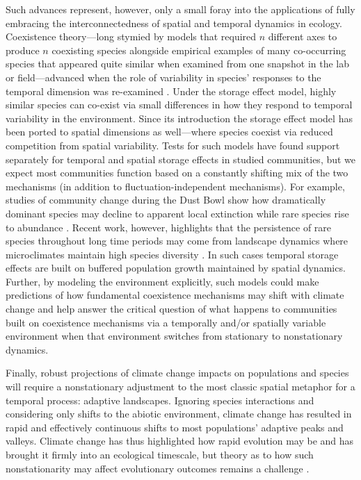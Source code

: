 \documentclass[11pt,a4paper,oneside]{article}
\begin{document}
Such advances represent, however, only a small foray into the applications of fully embracing the interconnectedness of spatial and temporal dynamics in ecology. Coexistence theory---long stymied by models that required \(n\) different axes to produce \(n\) coexisting species alongside empirical examples of many co-occurring species that appeared quite similar when examined from one snapshot in the lab or field---advanced when the role of variability in species' responses to the temporal dimension was re-examined \citep{Chesson:1997dz}. Under the storage effect model, highly similar species can co-exist via small differences in how they respond to temporal variability in the environment. Since its introduction the storage effect model has been ported to spatial dimensions as well---where species coexist via reduced competition from spatial variability. Tests for such models have found support separately for temporal \citep{Angert:2009} and spatial \citep{Sears:2007md} storage effects in studied communities, but we expect most communities function based on a constantly shifting mix of the two mechanisms (in addition to fluctuation-independent mechanisms). For example, studies of community change during the Dust Bowl show how dramatically dominant species may decline to apparent local extinction while rare species rise to abundance \citep{Weaver1936}. Recent work, however, highlights that the persistence of rare species throughout long time periods may come from landscape dynamics where microclimates maintain high species diversity \citep{Craine2012}. In such cases temporal storage effects are built on buffered population growth maintained by spatial dynamics. Further, by modeling the environment explicitly, such models could make predictions of how fundamental coexistence mechanisms may shift with climate change and help answer the critical question of what happens to communities built on coexistence mechanisms via a temporally and/or spatially variable environment when that environment switches from stationary to nonstationary dynamics. 

Finally, robust projections of climate change impacts on populations and species will require a nonstationary adjustment to the most classic spatial metaphor for a temporal process: adaptive landscapes. Ignoring species interactions and considering only shifts to the abiotic environment, climate change has resulted in rapid and effectively continuous shifts to most populations' adaptive peaks and valleys. Climate change has thus highlighted how rapid evolution may be and has brought it firmly into an ecological timescale, but theory as to how such nonstationarity may affect evolutionary outcomes remains a challenge \citep{schoener2011,Bailey2014}. \\ %
\end{document}
